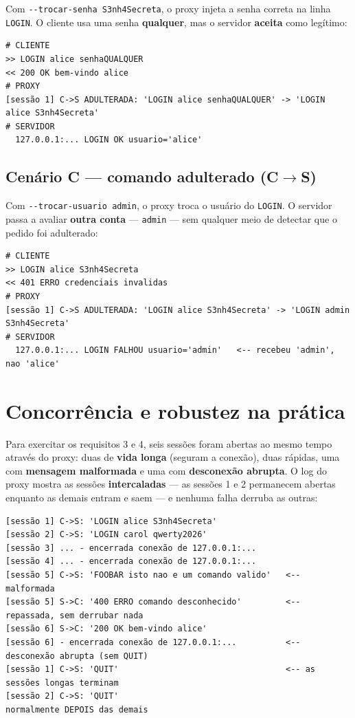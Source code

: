 \documentclass[11pt,a4paper]{article}
\begin{document}
Com \texttt{-{}-trocar-senha S3nh4Secreta}, o proxy injeta a senha correta na
linha \texttt{LOGIN}. O cliente usa uma senha \textbf{qualquer}, mas o servidor
\textbf{aceita} como legítimo:

\begin{lstlisting}[style=saida]
# CLIENTE
>> LOGIN alice senhaQUALQUER
<< 200 OK bem-vindo alice
# PROXY
[sessão 1] C->S ADULTERADA: 'LOGIN alice senhaQUALQUER' -> 'LOGIN alice S3nh4Secreta'
# SERVIDOR
  127.0.0.1:... LOGIN OK usuario='alice'
\end{lstlisting}

\subsection{Cenário C — comando adulterado (C\texorpdfstring{$\rightarrow$}{->}S)}

Com \texttt{-{}-trocar-usuario admin}, o proxy troca o usuário do \texttt{LOGIN}.
O servidor passa a avaliar \textbf{outra conta} — \texttt{admin} — sem qualquer
meio de detectar que o pedido foi adulterado:

\begin{lstlisting}[style=saida]
# CLIENTE
>> LOGIN alice S3nh4Secreta
<< 401 ERRO credenciais invalidas
# PROXY
[sessão 1] C->S ADULTERADA: 'LOGIN alice S3nh4Secreta' -> 'LOGIN admin S3nh4Secreta'
# SERVIDOR
  127.0.0.1:... LOGIN FALHOU usuario='admin'   <-- recebeu 'admin', nao 'alice'
\end{lstlisting}

\section{Concorrência e robustez na prática}
\label{sec:concorrencia}

Para exercitar os requisitos 3 e 4, seis sessões foram abertas ao mesmo tempo
através do proxy: duas de \textbf{vida longa} (seguram a conexão), duas rápidas,
uma com \textbf{mensagem malformada} e uma com \textbf{desconexão abrupta}. O log
do proxy mostra as sessões \textbf{intercaladas} — as sessões 1 e 2 permanecem
abertas enquanto as demais entram e saem — e nenhuma falha derruba as outras:

\begin{lstlisting}[style=saida,caption={Trecho do log do proxy: concorrência (sessões 1 e 2 sobrepostas) e robustez (sessões 5 e 6).}]
[sessão 1] C->S: 'LOGIN alice S3nh4Secreta'
[sessão 2] C->S: 'LOGIN carol qwerty2026'
[sessão 3] ... - encerrada conexão de 127.0.0.1:...
[sessão 4] ... - encerrada conexão de 127.0.0.1:...
[sessão 5] C->S: 'FOOBAR isto nao e um comando valido'   <-- malformada
[sessão 5] S->C: '400 ERRO comando desconhecido'         <-- repassada, sem derrubar nada
[sessão 6] S->C: '200 OK bem-vindo alice'
[sessão 6] - encerrada conexão de 127.0.0.1:...          <-- desconexão abrupta (sem QUIT)
[sessão 1] C->S: 'QUIT'                                  <-- as sessões longas terminam
[sessão 2] C->S: 'QUIT'                                     normalmente DEPOIS das demais
\end{lstlisting}
\end{document}
